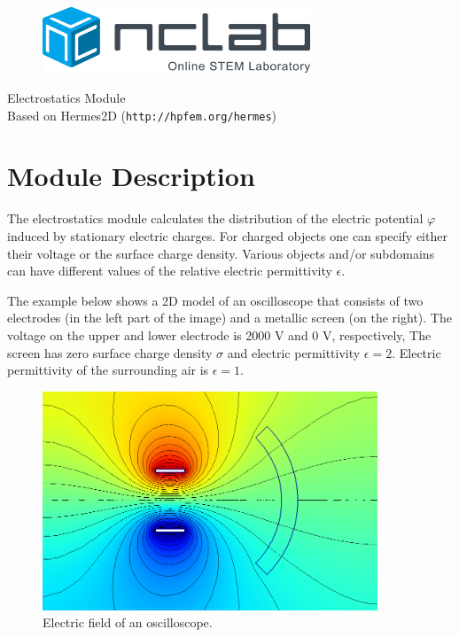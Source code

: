 \documentclass{article}
\begin{document}
\large

\vbox{}
\vspace{-2cm}
\begin{figure}[!ht]
\includegraphics[width=8cm]{img/logo.png}
\vspace{4mm}
\end{figure}
\noindent
\begin{center}
{\Huge Electrostatics Module}\\[2mm]
Based on Hermes2D ({\tt http://hpfem.org/hermes})\\[6mm]
\end{center}
\section{Module Description}

The electrostatics module calculates the distribution of the electric 
potential $\varphi$ induced by stationary electric charges. For charged 
objects one can specify either their voltage or the surface charge density.
Various objects and/or subdomains can have different values of the relative 
electric permittivity $\epsilon$.

The example below shows a 2D model of an oscilloscope that consists of
two electrodes (in the left part of the image) and a metallic screen (on the right). 
The voltage on the upper and lower electrode is 2000 V and 0 V, respectively,
The screen has zero surface charge density $\sigma$ and electric permittivity 
$\epsilon = 2$. Electric permittivity of the surrounding air is $\epsilon = 1$.\\
 

\begin{figure}[!ht]
\begin{center}
\includegraphics[width=10cm]{img/oscillo.png}
\caption{Electric field of an oscilloscope.}
\vspace{4mm}
\end{center}
\end{figure}
\noindent
\end{document}
